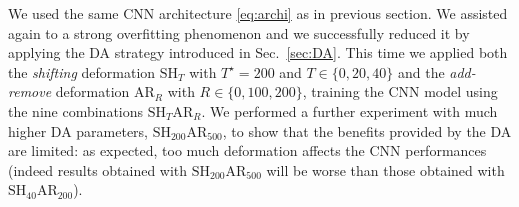 %


%
%


We used the same CNN architecture \eqref{eq:archi} as in previous section. We assisted again to a strong overfitting phenomenon and we successfully reduced it by applying the DA strategy introduced in Sec.~\ref{sec:DA}. This time we applied both the \emph{shifting} deformation $\mathrm{SH}_T$ with $T^\star = 200$ and $T\in\{0,20,40\}$ and the \emph{add-remove} deformation $\mathrm{AR}_R$ with $R\in \{0,100,200\}$, training the CNN model using the nine combinations $\mathrm{SH}_T\mathrm{AR}_R$. We performed a further experiment with much higher DA parameters, \ie $\mathrm{SH}_{200}\mathrm{AR}_{500}$, to show that the benefits provided by the DA are limited: as expected, too much deformation affects the CNN performances (indeed results obtained with $\mathrm{SH}_{200}\mathrm{AR}_{500}$ will be worse than those obtained with \eg $\mathrm{SH}_{40}\mathrm{AR}_{200}$).





